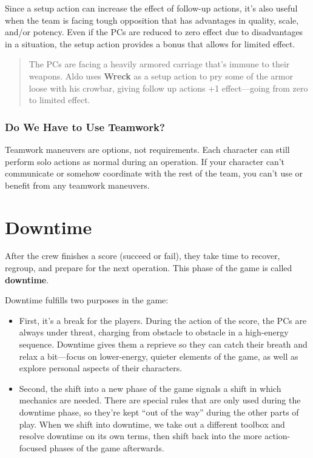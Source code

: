 \documentclass[11pt,oneside]{book}
\newcommand{\gameterm}[1]{\textbf{#1}}
\begin{document}
Since a setup action can increase the effect of follow-up actions, it’s also useful when the team is facing tough opposition that has advantages in quality, scale, and/or potency. Even if the PCs are reduced to zero effect due to disadvantages in a situation, the setup action provides a bonus that allows for limited effect.

\begin{quote}
	The PCs are facing a heavily armored carriage that’s immune to their weapons. Aldo uses \gameterm{Wreck}  as a setup action to pry some of the armor loose with his crowbar, giving follow up actions +1 effect---going from zero to limited effect.
\end{quote} 

\section{Do We Have to Use Teamwork?}

Teamwork maneuvers are options, not requirements. Each character can still perform solo actions as normal during an operation. If your character can’t communicate or somehow coordinate with the rest of the team, you can’t use or benefit from any teamwork maneuvers.

\part{Downtime}

After the crew finishes a score (succeed or fail), they take time to recover, regroup, and prepare for the next operation. This phase of the game is called \textbf{downtime}.

Downtime fulfills two purposes in the game:

\begin{itemize}
	\item First, it’s a break for the players. During the action of the score, the PCs are always under threat, charging from obstacle to obstacle in a high-energy sequence. Downtime gives them a reprieve so they can catch their breath and relax a bit---focus on lower-energy, quieter elements of the game, as well as explore personal aspects of their characters.
	\item Second, the shift into a new phase of the game signals a shift in which mechanics are needed. There are special rules that are only used during the downtime phase, so they’re kept “out of the way” during the other parts of play. When we shift into downtime, we take out a different toolbox and resolve downtime on its own terms, then shift back into the more action-focused phases of the game afterwards.
\end{itemize}
\end{document}
